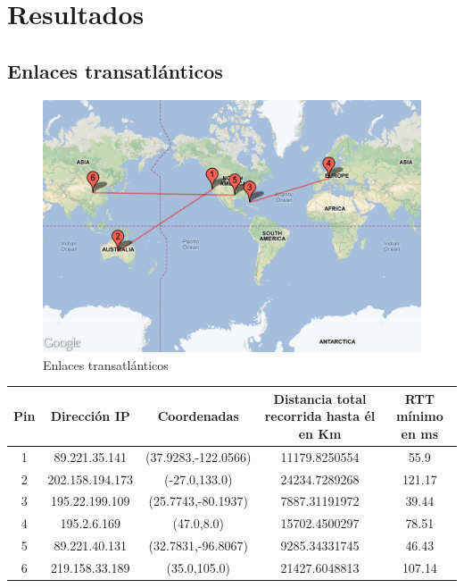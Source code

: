 \section{Resultados}

\subsection{Enlaces transatlánticos}

\begin{figure}[H]
\begin{center}
\includegraphics[width=17cm]{enlaces.png}
\end{center}
\caption{Enlaces transatlánticos} \label{figura1}
\end{figure}

\noindent \begin{center} \begin{tabular}{| c | c | c | c | c |} \hline 
Pin 	 & 	 Dirección IP 	 & 	 Coordenadas 	 & 	 Distancia total recorrida hasta él en Km 	 & 	 RTT mínimo en ms \\ \hline 
1 	 & 	 89.221.35.141 	 & 	 (37.9283,-122.0566) 	 & 	 11179.8250554 	 & 	 55.9 \\ \hline 
2 	 & 	 202.158.194.173 	 & 	 (-27.0,133.0) 	 & 	 24234.7289268 	 & 	 121.17 \\ \hline 
3 	 & 	 195.22.199.109 	 & 	 (25.7743,-80.1937) 	 & 	 7887.31191972 	 & 	 39.44 \\ \hline 
4 	 & 	 195.2.6.169 	 & 	 (47.0,8.0) 	 & 	 15702.4500297 	 & 	 78.51 \\ \hline 
5 	 & 	 89.221.40.131 	 & 	 (32.7831,-96.8067) 	 & 	 9285.34331745 	 & 	 46.43 \\ \hline 
6 	 & 	 219.158.33.189 	 & 	 (35.0,105.0) 	 & 	 21427.6048813 	 & 	 107.14 \\ \hline 
\end{tabular} \end{center}


